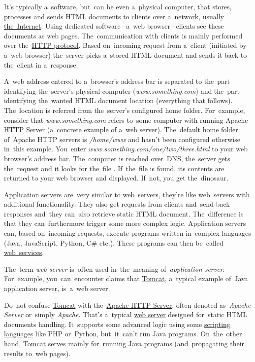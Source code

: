 \label{namespaces}

\label{webserver}
It's typically a~software, but~can be even a~physical computer, that stores, processes and sends HTML documents to clients over a~network, usually \hyperref[internetweb]{the~Internet}. Using dedicated software\,--\,a~web browser\,--\,clients see these documents as web pages. The~communication with clients is mainly performed over the~\hyperref[http]{HTTP protocol}. Based on~incoming request from a~client (initiated by a~web browser) the~server picks a~stored HTML document and sends it back to the~client in a~response.

A~web address entered to a~browser's address bar is separated to the~part identifying the~server's physical computer (\textit{www.something.com}) and the~part identifying the~wanted HTML document location (everything that follows). The~location is referred from the~server's configured home folder. For~example, consider that \textit{www.something.com} refers to~some computer with running Apache HTTP Server (a~concrete example of a~web server). The~default home folder of~Apache HTTP servers is \textit{/home/www} and hasn't been configured otherwise in~this example. You~enter \textit{www.something.com/one/two/three.html} to your web browser's address bar. The~computer is reached over~\hyperref[dns]{DNS}, the~server gets the~request and it looks for the~file . If~the~file is found, its contents are returned to your web browser and displayed. If~not, you get the~dinosaur.

\label{applicationserver}
Application servers are~very similar to web~servers, they're like web~servers with additional functionality. They also get requests from clients and~send back responses and~they can~also retrieve static HTML document. The~difference is that they can~furthermore trigger some more complex logic. Application servers can, based on~incoming requests, execute programs written in~complex languages (Java, JavaScript, Python, C\# etc.). These programs can then be~called \hyperref[webservice]{web~services}.

\warning The~term \textit{web server} is~often used in~the~meaning of~\textit{application server}. For~example, you~can~encounter claims that \hyperref[tomcat]{Tomcat}, a~typical example of~Java application server, is~a~web server.

\warning Do~not confuse \hyperref[tomcat]{Tomcat} with the~\href{https://en.wikipedia.org/wiki/Apache_HTTP_Server}{Apache HTTP Server}, often denoted as~\textit{Apache Server} or~simply \textit{Apache}. That's a~typical \hyperref[webserver]{web server} designed for~static HTML documents handling. It~supports some advanced logic using some \hyperref[scriptinglanguages]{scripting languages} like PHP or~Python, but~it~can't run Java programs. On~the~other hand, \hyperref[tomcat]{Tomcat} serves mainly for~running Java programs (and~propagating their results to~web pages).

\label{dns}
